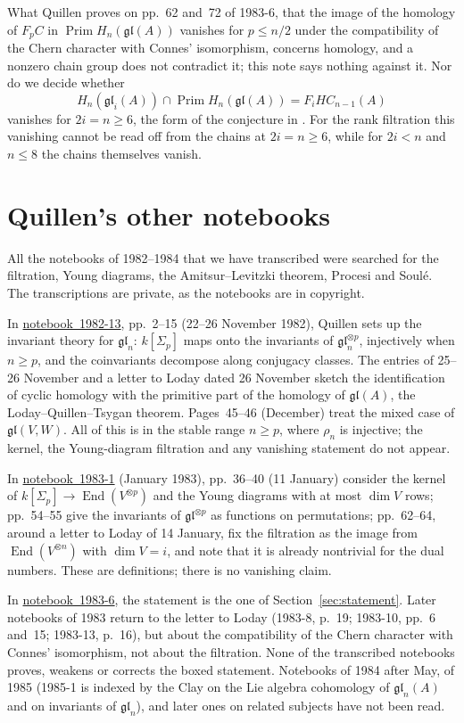 \documentclass[11pt,a4paper]{amsart}
\theoremstyle{definition}
\theoremstyle{remark}
\newcommand{\gl}{\mathfrak{gl}}
\newcommand{\End}{\operatorname{End}}
\newcommand{\Prim}{\operatorname{Prim}}
\newcommand{\nb}[2]{\href{https://www.claymath.org/library/Quillen/Working_papers/quillen\%20#1/#1-#2.pdf}{notebook~#1-#2}}
\begin{document}
What Quillen proves on pp.~62 and~72 of 1983-6, that the image of the homology of $F_p C$ in $\Prim H_n(\gl(A))$ vanishes for $p \le n/2$ under the compatibility of the Chern character with Connes' isomorphism, concerns homology, and a nonzero chain group does not contradict it; this note says nothing against it. Nor do we decide whether
\[
H_n(\gl_i(A)) \cap \Prim H_n(\gl(A)) = F_i HC_{n-1}(A)
\]
vanishes for $2i = n \ge 6$, the form of the conjecture in \cite[\S6.13]{lq}. For the rank filtration this vanishing cannot be read off from the chains at $2i = n \ge 6$, while for $2i < n$ and $n \le 8$ the chains themselves vanish.

\section{Quillen's other notebooks}\label{sec:notebooks}

All the notebooks of 1982--1984 that we have transcribed were searched for the filtration, Young diagrams, the Amitsur--Levitzki theorem, Procesi and Soulé. The transcriptions are private, as the notebooks are in copyright.

In \nb{1982}{13}, pp.~2--15 (22--26 November 1982), Quillen sets up the invariant theory for $\gl_n$: $k[\Sigma_p]$ maps onto the invariants of $\gl_n^{\otimes p}$, injectively when $n \ge p$, and the coinvariants decompose along conjugacy classes. The entries of 25--26 November and a letter to Loday dated 26 November sketch the identification of cyclic homology with the primitive part of the homology of $\gl(A)$, the Loday--Quillen--Tsygan theorem. Pages~45--46 (December) treat the mixed case of $\gl(V, W)$. All of this is in the stable range $n \ge p$, where $\rho_n$ is injective; the kernel, the Young-diagram filtration and any vanishing statement do not appear.

In \nb{1983}{1} (January 1983), pp.~36--40 (11 January) consider the kernel of $k[\Sigma_p] \to \End(V^{\otimes p})$ and the Young diagrams with at most $\dim V$ rows; pp.~54--55 give the invariants of $\gl^{\otimes p}$ as functions on permutations; pp.~62--64, around a letter to Loday of 14 January, fix the filtration as the image from $\End(V^{\otimes n})$ with $\dim V = i$, and note that it is already nontrivial for the dual numbers. These are definitions; there is no vanishing claim.

In \nb{1983}{6}, the statement is the one of Section~\ref{sec:statement}. Later notebooks of 1983 return to the letter to Loday (1983-8, p.~19; 1983-10, pp.~6 and~15; 1983-13, p.~16), but about the compatibility of the Chern character with Connes' isomorphism, not about the filtration. None of the transcribed notebooks proves, weakens or corrects the boxed statement. Notebooks of 1984 after May, of 1985 (1985-1 is indexed by the Clay on the Lie algebra cohomology of $\gl_n(A)$ and on invariants of $\gl_n$), and later ones on related subjects have not been read.
\end{document}

